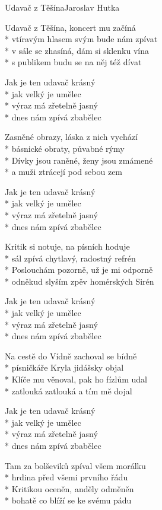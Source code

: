 \documentclass[10.5pt]{book}
\begin{document}
\begin{poem}{Udavač z Těšína}{Jaroslav Hutka}

\settowidth{\versewidth}{vtíravým hlasem svým bude nám zpívat}

Udavač z Těšína, koncert mu začíná\\*
vtíravým hlasem svým bude nám zpívat\\*
v sále se zhasíná, dám si sklenku vína\\*
s publikem budu se na něj též dívat

Jak je ten udavač krásný\\*
jak velký je umělec\\*
výraz má zřetelně jasný\\*
dnes nám zpívá zbabělec

Zasněné obrazy, láska z nich vychází\\*
básnické obraty, půvabné rýmy\\*
Dívky jsou raněné, ženy jsou zmámené\\*
a muži ztrácejí pod sebou zem

Jak je ten udavač krásný\\*
jak velký je umělec\\*
výraz má zřetelně jasný\\*
dnes nám zpívá zbabělec

Kritik si notuje, na písních hoduje\\*
sál zpívá chytlavý, radostný refrén\\*
Poslouchám pozorně, už je mi odporně\\*
odněkud slyším zpěv homérských Sirén

Jak je ten udavač krásný\\*
jak velký je umělec\\*
výraz má zřetelně jasný\\*
dnes nám zpívá zbabělec

Na cestě do Vídně zachoval se bídně\\*
písničkáře Kryla jidášsky objal\\*
Klíče mu věnoval, pak ho fízlům udal\\*
zatlouká zatlouká a tím mě dojal

Jak je ten udavač krásný\\*
jak velký je umělec\\*
výraz má zřetelně jasný\\*
dnes nám zpívá zbabělec

Tam za bolševiků zpíval všem morálku\\*
hrdina před všemi prvního řádu\\*
Kritikou oceněn, anděly odměněn\\*
bohatě co blíží se ke svému pádu

\end{poem}
\end{document}
